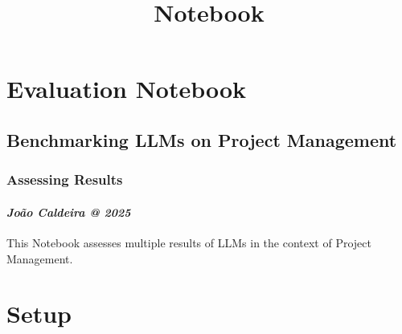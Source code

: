 \documentclass[11pt]{article}
\title{Notebook}
\begin{document}
    
    \maketitle
    
    

    
    \section{\texorpdfstring{Evaluation Notebook
}{Evaluation Notebook }}\label{evaluation-notebook}

\subsection{\texorpdfstring{\textbf{Benchmarking LLMs on Project
Management}}{Benchmarking LLMs on Project Management}}\label{benchmarking-llms-on-project-management}

\subsubsection{\texorpdfstring{\textbf{Assessing
Results}}{Assessing Results}}\label{assessing-results}

\paragraph{\texorpdfstring{ \emph{João Caldeira @
2025}}{ João Caldeira @ 2025}}\label{jouxe3o-caldeira-2025}

This Notebook assesses multiple results of LLMs in the context of
Project Management.

    \section{Setup}\label{setup}
\end{document}
